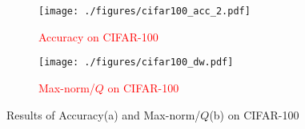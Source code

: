 \documentclass[a4paper,twoside,11pt,dvipsnames]{reviewresponse}
\begin{document}
\begin{figure}[tb]
    \centering
    \begin{subfigure}[t]{0.45\textwidth} %
        \centering
        \texttt{[image: ./figures/cifar100\_acc\_2.pdf]}
        \caption{\textcolor{red}{Accuracy on CIFAR-100}} %
        \label{result2:CIFAR100-hetero-norm}
    \end{subfigure}%
    \hfill
    \begin{subfigure}[t]{0.48\textwidth} %
        \centering
        \texttt{[image: ./figures/cifar100\_dw.pdf]}
        \caption{\textcolor{red}{Max-norm/$Q$ on CIFAR-100}} %
        \label{result2:CIFAR100-hetero-acc}
    \end{subfigure}
    \vspace{-0.3cm}
    \caption{Results of Accuracy(a) and Max-norm/$Q$(b) on CIFAR-100}
    \label{fig:cifar100-comparison}
\end{figure}



\end{document}
